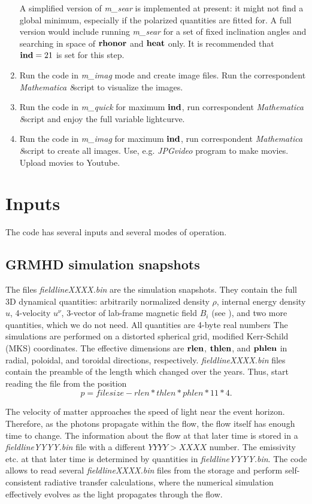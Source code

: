 \documentclass{emulateapj}
\newcommand{\mat}{\textit{Mathematica 8}}
\begin{document}
\begin{enumerate}
{A simplified version of \textit{m\_sear} is implemented at present: it might not find a global minimum, especially if the polarized quantities are fitted for.
A full version would include running \textit{m\_sear} for a set of fixed inclination angles and searching in space of $\bf rhonor$ and $\bf heat$ only.
It is recommended that ${\bf ind}=21$ is set for this step.}
\item{Run the code in \textit{m\_imag} mode and create image files. Run the correspondent \mat script to visualize the images.}
\item{Run the code in \textit{m\_quick} for maximum $\bf ind$, run correspondent \mat script and enjoy the full variable lightcurve.}
\item{Run the code in \textit{m\_imag} for maximum $\bf ind$, run correspondent \mat script to create all images. Use, e.g. \textit{JPGvideo} program to make movies.
Upload movies to Youtube.}
\end{enumerate}

\section{Inputs}
The code has several inputs and several modes of operation.
\subsection{GRMHD simulation snapshots}
The files \textit{fieldlineXXXX.bin} are the simulation snapshots. They contain the full 3D dynamical quantities: arbitrarily normalized density $\rho$, internal energy density $u$,
4-velocity $u^\nu$, 3-vector of lab-frame magnetic field $B_i$ (see \citealt{Penna:2010dj}), and two more quantities, which we do not need. All quantities are 4-byte real numbers
The simulations are performed on a distorted spherical grid, modified Kerr-Schild (MKS) coordinates. The effective dimensions are ${\bf rlen}$, ${\bf thlen}$, and ${\bf phlen}$
in radial, poloidal, and toroidal directions, respectively. \textit{fieldlineXXXX.bin} files contain the preamble of the length which changed over the years.
Thus, start reading the file from the position
\begin{equation}
p=filesize-rlen*thlen*phlen*11*4.
\end{equation}

The velocity of matter approaches the speed of light near the event horizon. Therefore, as the photons propagate within the flow, the flow itself has enough time to change.
The information about the flow at that later time is stored in a \textit{fieldlineYYYY.bin} file with a different $YYYY>XXXX$ number. The emissivity etc.
at that later time is determined by quantities in \textit{fieldlineYYYY.bin}. The code allows to read several \textit{fieldlineXXXX.bin} files from the storage
and perform self-consistent radiative transfer calculations, where the numerical simulation effectively evolves as the light propagates through the flow.
\end{document}
